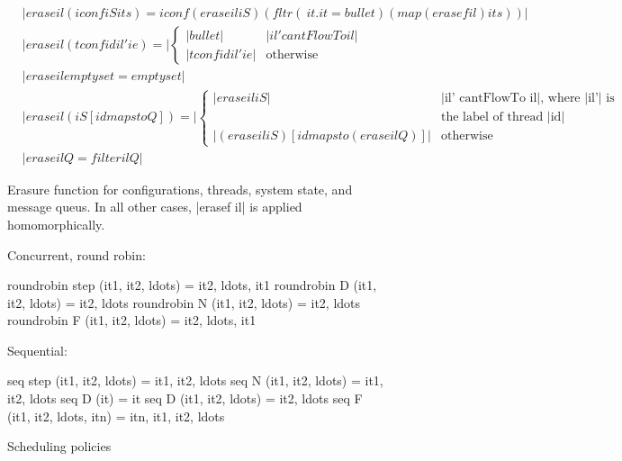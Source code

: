 \begin{figure}
\begin{align*}
  &|erase il (iconf iS its) =
  iconf (erase il iS) (fltr (\ it . it = bullet) (map (erasef il) its))| \\
  &|erase il (tconf id il' ie) =| \begin{cases}
    |bullet| & |il' cantFlowTo il| \\
    |tconf id il' ie| & \text{otherwise}
  \end{cases} \\
  &|erase il emptyset = emptyset|\\
  &|erase il (iS [id mapsto Q]) =| \begin{cases}
    |erase il iS| & \text{|il' cantFlowTo il|, where |il'| is}\\
    & \text{the label of thread |id|} \\
    |(erase il iS) [id mapsto (erase il Q)]| & \text{otherwise}
  \end{cases} \\
  &|erase il Q = filter il Q|
\end{align*}
\caption{
Erasure function for configurations, threads, system state, and
message queus.  In all other cases, |erasef il| is applied
homomorphically.
\label{fig:erasure}
}
\end{figure}


\begin{figure}
  Concurrent, round robin:
\begin{code}
  roundrobin step (it1, it2, ldots)  = it2, ldots, it1
  roundrobin D (it1, it2, ldots)     = it2, ldots
  roundrobin N (it1, it2, ldots)     = it2, ldots
  roundrobin F (it1, it2, ldots)     = it2, ldots, it1
\end{code}
  Sequential:
\begin{code}
  seq step (it1, it2, ldots)     = it1, it2, ldots
  seq N (it1, it2, ldots)        = it1, it2, ldots
  seq D (it)                     = it
  seq D (it1, it2, ldots)        = it2, ldots
  seq F (it1, it2, ldots, itn)   = itn, it1, it2, ldots
\end{code}
\caption{Scheduling policies}
\end{figure}


